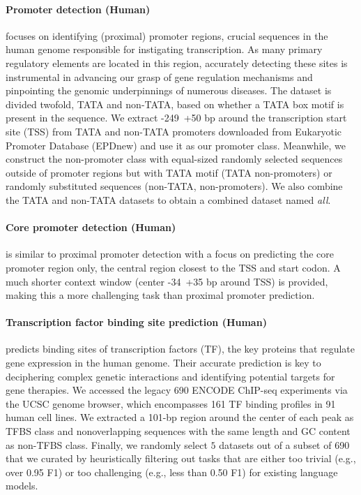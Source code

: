 \documentclass{article}
\begin{document}
\paragraph{Promoter detection (Human)} focuses on identifying (proximal) promoter regions, crucial sequences in the human genome responsible for instigating transcription. As many primary regulatory elements are located in this region, accurately detecting these sites is instrumental in advancing our grasp of gene regulation mechanisms and pinpointing the genomic underpinnings of numerous diseases. The dataset is divided twofold, TATA and non-TATA, based on whether a TATA box motif is present in the sequence. We extract -249~+50 bp around the transcription start site (TSS) from TATA and non-TATA promoters downloaded from Eukaryotic Promoter Database (EPDnew) \citep{dreos2013epd} and use it as our promoter class. Meanwhile, we construct the non-promoter class with equal-sized randomly selected sequences outside of promoter regions but with TATA motif (TATA non-promoters) or randomly substituted sequences (non-TATA, non-promoters). We also combine the TATA and non-TATA datasets to obtain a combined dataset named \textit{all}.

\paragraph{Core promoter detection (Human)} is similar to proximal promoter detection with a focus on predicting the core promoter region only, the central region closest to the TSS and start codon. A much shorter context window (center -34~+35 bp around TSS) is provided, making this a more challenging task than proximal promoter prediction. 



\paragraph{Transcription factor binding site prediction (Human)}  predicts binding sites of transcription factors (TF), the key proteins that regulate gene expression in the human genome. Their accurate prediction is key to deciphering complex genetic interactions and identifying potential targets for gene therapies. We accessed the legacy 690 ENCODE ChIP-seq experiments \citep{encode2012integrated} via the UCSC genome browser, which encompasses 161 TF binding profiles in 91 human cell lines. We extracted a 101-bp region around the center of each peak as TFBS class and nonoverlapping sequences with the same length and GC content as non-TFBS class. Finally, we randomly select $5$ datasets out of a subset of 690 that we curated by heuristically filtering out tasks that are either too trivial (e.g., over 0.95 F1) or too challenging (e.g., less than 0.50 F1) for existing language models.
\end{document}
